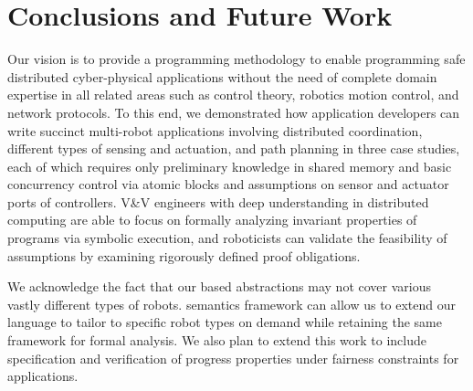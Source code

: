 \section{Conclusions and Future Work}


Our vision is to provide a programming methodology to enable programming safe distributed cyber-physical applications without the need of complete domain expertise in all related areas such as control theory, robotics motion control, and network protocols.
To this end, we demonstrated how \lgname application developers can write succinct multi-robot applications involving distributed coordination,
different types of sensing and actuation, and path planning in three case studies, each of which requires only preliminary knowledge
in shared memory and basic concurrency control via atomic blocks and assumptions on sensor and actuator ports of controllers.
V\&V engineers with deep understanding in distributed computing are able to focus on formally analyzing invariant properties of \lgname programs via symbolic execution, and roboticists can validate the feasibility of assumptions by examining rigorously defined proof obligations.

We acknowledge the fact that our \portasum based abstractions may not cover various vastly different types of robots.
\K semantics framework can allow us to extend our language to tailor to specific robot types on demand
while retaining the same framework for formal analysis. We also plan to extend this work to include specification and verification of progress properties under fairness constraints for \lgname applications.
